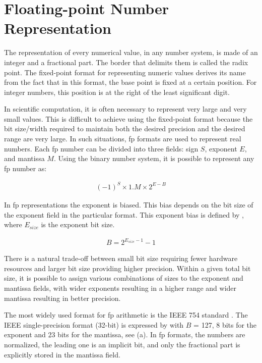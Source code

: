 \section{Floating-point Number Representation}
The representation of every numerical value, in any number system, is made of an integer and a fractional part. The border that delimits them is called the radix point. The fixed-point format for representing numeric values derives its name from the fact that in this format, the base point is fixed at a certain position. For integer numbers, this position is at the right of the least significant digit.

In scientific computation, it is often necessary to represent very large and very small values. This is difficult to achieve using the fixed-point format because the bit size/width required to maintain both the desired precision and the desired range are very large. In such situations, \gls{fp} formats are used to represent real numbers. Each \gls{fp} number can be divided into three fields: sign $S$, exponent $E$, and mantissa $M$. Using the binary number system, it is possible to represent any \gls{fp} number as:

\begin{eqnarray} \label{eq:float}
(-1)^{S} \times 1.M \times 2^{E-B}
\end{eqnarray}

In \gls{fp} representations the exponent is biased. This bias depends on the bit size of the exponent field in the particular format. This exponent bias is defined by , where $E_{size}$ is the exponent bit size.

\begin{eqnarray} \label{eq:float_bias}
B=2^{E_{size}-1}-1
\end{eqnarray}

There is a natural trade-off between small bit size requiring fewer hardware resources and larger bit size providing higher precision. Within a given total bit size, it is possible to assign various combinations of sizes to the exponent and mantissa fields, with wider exponents resulting in a higher range and wider mantissa resulting in better precision.

The most widely used format for \gls{fp} arithmetic is the IEEE 754 standard \cite{zuras2008ieee}. The IEEE single-precision format (32-bit) is expressed by  with $B$ = 127, 8 bits for the exponent and 23 bits for the mantissa, see (a). In \gls{fp} formats, the numbers are normalized, the leading one is an implicit bit, and only the fractional part is explicitly stored in the mantissa field.

